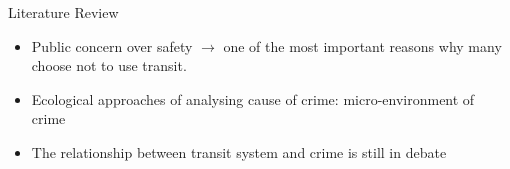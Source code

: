 \documentclass{beamer}
\begin{document}
\begin{frame}{Literature Review}
\begin{itemize}
 \item Public concern over safety $\longrightarrow$ one of the most important reasons why many choose not to use transit. 
\item Ecological approaches of analysing cause of crime: micro-environment of crime 
\item The relationship between transit system and crime is still in debate
\end{itemize}

\begin{figure}%
\hfill
{}
\hfill
{}
\hfill\hfill
\label{fig:station_samples}
\end{figure}

\end{frame}
\end{document}

